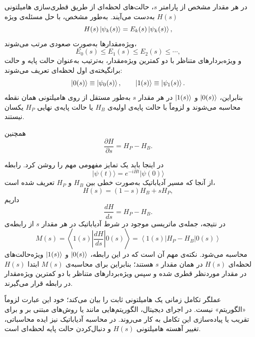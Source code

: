 در هر مقدار مشخص از پارامتر $s$، حالت‌های لحظه‌ای از طریق قطری‌سازی هامیلتونی $H(s)$ به‌دست می‌آیند. به‌طور مشخص، با حل مسئله‌ی ویژه
\begin{equation}
	H(s)\ket{\psi_k(s)}=E_k(s)\ket{\psi_k(s)},
\end{equation}
ویژه‌مقدارها به‌صورت صعودی مرتب می‌شوند،
\begin{equation}
	E_0(s)\leq E_1(s)\leq E_2(s)\leq\cdots,
\end{equation}
و ویژه‌بردارهای متناظر با دو کمترین ویژه‌مقدار، به‌ترتیب به‌عنوان حالت پایه و حالت برانگیخته‌ی اول لحظه‌ای تعریف می‌شوند:
\begin{equation}
	\ket{0(s)}\equiv\ket{\psi_0(s)},\qquad
	\ket{1(s)}\equiv\ket{\psi_1(s)}.
\end{equation}
بنابراین، $\ket{0(s)}$ و $\ket{1(s)}$ در هر مقدار $s$ به‌طور مستقل از روی هامیلتونی همان نقطه محاسبه می‌شوند و لزوماً با حالت پایه‌ی اولیه‌ی $H_B$ یا حالت پایه‌ی نهایی $H_P$ یکسان نیستند.


همچنین
\begin{equation}
	\label{eq:dHds-example}
	\frac{\partial H}{\partial s}
	=
	H_P-H_B.
\end{equation}

در اینجا باید یک تمایز مفهومی مهم را روشن کرد. رابطه
\begin{equation}
	\lvert\psi(t)\rangle
	=
	e^{-iHt}\lvert\psi(0)\rangle
\end{equation}
از آنجا که مسیر آدیاباتیک به‌صورت خطی بین $H_B$ و $H_P$ تعریف شده است،
\begin{equation}
	H(s)=(1-s)H_B+sH_P,
\end{equation}
داریم
\begin{equation}
	\frac{dH}{ds}=H_P-H_B.
\end{equation}
در نتیجه، جمله‌ی ماتریسی موجود در شرط آدیاباتیک در هر مقدار $s$ از رابطه‌ی
\begin{equation}
	M(s)
	=
	\left\langle 1(s)\left|
	\frac{dH}{ds}
	\right|0(s)\right\rangle
	=
	\left\langle 1(s)\left|
	H_P-H_B
	\right|0(s)\right\rangle
\end{equation}
محاسبه می‌شود. نکته‌ی مهم آن است که در این رابطه، $\ket{0(s)}$ و $\ket{1(s)}$ ویژه‌حالت‌های لحظه‌ای $H(s)$ در همان مقدار $s$ هستند؛ بنابراین برای محاسبه‌ی $M(s)$ ابتدا $H(s)$ در مقدار موردنظر قطری شده و سپس ویژه‌بردارهای متناظر با دو کمترین ویژه‌مقدار در رابطه قرار می‌گیرند.



عملگر تکامل زمانی یک هامیلتونی ثابت را بیان می‌کند؛ خود این عبارت لزوماً «الگوریتم» نیست. در اجرای دیجیتال، الگوریتم‌هایی مانند  یا روش‌های مبتنی بر  و  برای تقریب یا پیاده‌سازی این تکامل به کار می‌روند. در محاسبه آدیاباتیک نیز ایده محاسباتی، تغییر آهسته هامیلتونی $H(s)$ و دنبال‌کردن حالت پایه لحظه‌ای است.

